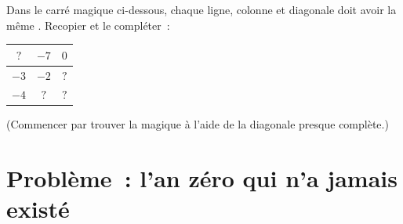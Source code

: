 \begin{exercise}[$\star\star\star$]\label{exo:g7:negatives:12}
Dans le carré magique ci-dessous, chaque ligne, colonne et diagonale
doit avoir la même . Recopier et le compléter~:
\begin{center}
\renewcommand{\arraystretch}{1.4}
\begin{tabular}{|c|c|c|}
\hline
$?$ & $-7$ & $0$ \\
\hline
$-3$ & $-2$ & $?$ \\
\hline
$-4$ & $?$ & $?$ \\
\hline
\end{tabular}
\end{center}
(Commencer par trouver la  magique à l'aide de la diagonale
presque complète.)
\end{exercise}

\section{Problème~: l'an zéro qui n'a jamais existé}

